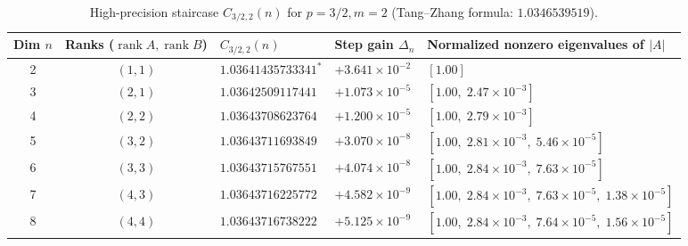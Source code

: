 \documentclass[10pt,letterpaper]{article}
\newcommand{\rank}{\operatorname{rank}}
\begin{document}
\begin{table}[H]
\centering
\caption{\small High-precision staircase $C_{3/2,2}(n)$ for $p = 3/2, m = 2$ (Tang--Zhang formula: $1.0346539519$).}
\vspace{3pt}
\footnotesize
\begin{tabular}{@{}c c l l l@{}}
\toprule
\textbf{Dim $n$} & \textbf{Ranks ($\rank A, \rank B$)} & \textbf{$C_{3/2,2}(n)$} & \textbf{Step gain $\Delta_n$} & \textbf{Normalized nonzero eigenvalues of $|A|$} \\
\midrule
2 & $(1,1)$ & $1.03641435733341^*$ & $+3.641\times 10^{-2}$ & $[1.00]$ \\
3 & $(2,1)$ & $1.03642509117441$   & $+1.073\times 10^{-5}$ & $[1.00,\; 2.47\times 10^{-3}]$ \\
4 & $(2,2)$ & $1.03643708623764$   & $+1.200\times 10^{-5}$ & $[1.00,\; 2.79\times 10^{-3}]$ \\
5 & $(3,2)$ & $1.03643711693849$   & $+3.070\times 10^{-8}$ & $[1.00,\; 2.81\times 10^{-3},\; 5.46\times 10^{-5}]$ \\
6 & $(3,3)$ & $1.03643715767551$   & $+4.074\times 10^{-8}$ & $[1.00,\; 2.84\times 10^{-3},\; 7.63\times 10^{-5}]$ \\
7 & $(4,3)$ & $1.03643716225772$   & $+4.582\times 10^{-9}$ & $[1.00,\; 2.84\times 10^{-3},\; 7.63\times 10^{-5},\; 1.38\times 10^{-5}]$ \\
8 & $(4,4)$ & $1.03643716738222$   & $+5.125\times 10^{-9}$ & $[1.00,\; 2.84\times 10^{-3},\; 7.64\times 10^{-5},\; 1.56\times 10^{-5}]$ \\
\bottomrule
\end{tabular}
\label{tab:p32}
\end{table}
\end{document}
